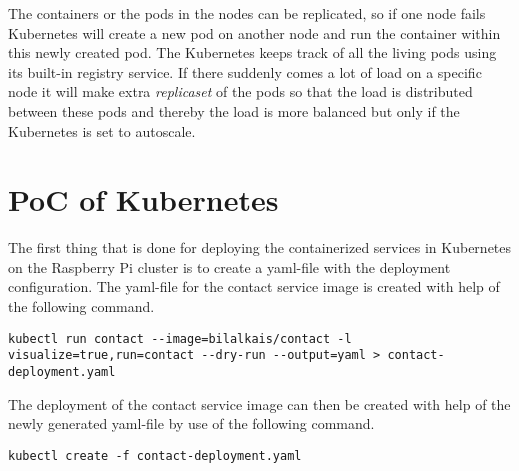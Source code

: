 The containers or the pods in the nodes can be replicated, so if one node fails Kubernetes will create a new pod on another node and run the container within this newly created pod. The Kubernetes keeps track of all the living pods using its built-in registry service.  
If there suddenly comes a lot of load on a specific node it will make extra \emph{replicaset} of the pods so that the load is distributed between these pods and thereby the load is more balanced but only if the Kubernetes is set to autoscale. 

\section{PoC of Kubernetes}




The first thing that is done for deploying the containerized services in Kubernetes on the Raspberry Pi cluster is to create a  yaml-file with the deployment configuration. The yaml-file for \eg the contact service image is created with help of the following command. 
\begin{lstlisting}[frame=single, ]
kubectl run contact --image=bilalkais/contact -l visualize=true,run=contact --dry-run --output=yaml > contact-deployment.yaml
\end{lstlisting}

The deployment of the contact service image can then be created with help of the newly generated yaml-file by use of the following command.
\begin{lstlisting}[frame=single, ]
kubectl create -f contact-deployment.yaml
\end{lstlisting}


